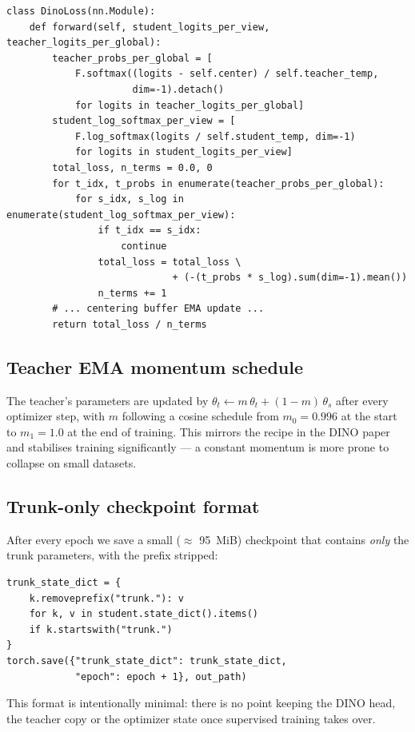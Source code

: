 \begin{lstlisting}[style=py]
class DinoLoss(nn.Module):
    def forward(self, student_logits_per_view, teacher_logits_per_global):
        teacher_probs_per_global = [
            F.softmax((logits - self.center) / self.teacher_temp,
                      dim=-1).detach()
            for logits in teacher_logits_per_global]
        student_log_softmax_per_view = [
            F.log_softmax(logits / self.student_temp, dim=-1)
            for logits in student_logits_per_view]
        total_loss, n_terms = 0.0, 0
        for t_idx, t_probs in enumerate(teacher_probs_per_global):
            for s_idx, s_log in enumerate(student_log_softmax_per_view):
                if t_idx == s_idx:
                    continue
                total_loss = total_loss \
                             + (-(t_probs * s_log).sum(dim=-1).mean())
                n_terms += 1
        # ... centering buffer EMA update ...
        return total_loss / n_terms
\end{lstlisting}

\subsection{Teacher EMA momentum schedule}

The teacher's parameters are updated by
\(\theta_t \leftarrow m\,\theta_t + (1-m)\,\theta_s\) after every
optimizer step, with \(m\) following a cosine schedule from
\(m_0 = 0.996\) at the start to \(m_1 = 1.0\) at the end of training.
This mirrors the recipe in the DINO paper and stabilises training
significantly --- a constant momentum is more prone to collapse on small
datasets.

\subsection{Trunk-only checkpoint format}

After every epoch we save a small ($\approx$ 95~MiB) checkpoint that
contains \emph{only} the trunk parameters, with the \code{trunk.}
prefix stripped:

\begin{lstlisting}[style=py]
trunk_state_dict = {
    k.removeprefix("trunk."): v
    for k, v in student.state_dict().items()
    if k.startswith("trunk.")
}
torch.save({"trunk_state_dict": trunk_state_dict,
            "epoch": epoch + 1}, out_path)
\end{lstlisting}

This format is intentionally minimal: there is no point keeping the DINO
head, the teacher copy or the optimizer state once supervised training
takes over.

